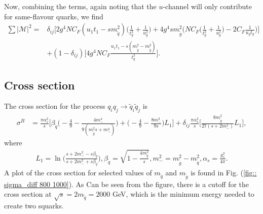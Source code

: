 \documentclass[11pt]{article}
\begin{document}
\begin{flushleft}
Now, combining the terms, again noting that the $u$-channel will only contribute for same-flavour quarks, we find
\begin{align*}
\sum |\mathcal{M}|^2 =& \delta_{ij}  \Bigg[2 g^4NC_F(u_1t_1-sm_{\tilde{q}}^2) \big( \frac{1}{t_g^2} + \frac{1}{u_g^2} \big) + 4 g^4 sm_{\tilde{g}}^2 \Big( NC_F \big(\frac{1}{t_g^2} + \frac{1}{u_g^2}\big) -2C_F\frac{1}{u_gt_g} \Big) \Bigg]\\
&+ (1-\delta_{ij})\Bigg[4g^4NC_F  \frac{u_1t_1-s(m_{\tilde{g}}^2-m_{\tilde{g}}^2)}{t_g^2} \Bigg].
\end{align*}
\end{flushleft}

\subsection*{Cross section}
\begin{flushleft}
The cross section for the process $q_iq_j \rightarrow \tilde{q}_i \tilde{q}_j$ is \cite{beenakker1997squark}
\begin{align*}
\sigma^B &= \frac{\pi \alpha_s^2}{s} \Bigg[\beta_{\tilde{q}} \Big(-\frac{4}{9} - \frac{4m_-^4}{9(m_{\tilde{g}}^2s+m_-^4)} \Big) + \Big(-\frac{4}{9}- \frac{8m_-^2}{9s} \Big) L_1 \Bigg]
+ \delta_{ij} \frac{\pi \alpha_s^2}{s} \Bigg[ \frac{8m_{\tilde{g}}^2}{27(s+2m_-^2)} L_1 \Bigg],
\end{align*}
where
\begin{align*}
L_1 = \ln \Big( \frac{s+2m_-^2-s \beta_{\tilde{q}}}{s+ 2m_-^2+s \beta_{\tilde{q}}} \Big), \beta_{\tilde{q}} = \sqrt{1-\frac{4m_{\tilde{q}}^2}{s}}, m_-^2 = m_{\tilde{g}}^2 - m_{\tilde{q}}^2, \alpha_s = \frac{g_s^2}{4 \pi}.
\end{align*}
A plot of the cross section for selected values of $m_{\tilde{q}}$ and $m_{\tilde{g}}$ is found in Fig. (\ref{fig:: sigma_diff 800 1000}). As Can be seen from the figure, there is a cutoff for the cross section at $\sqrt{s} = 2 m_{\tilde{q}} = 2000$ GeV, which is the minimum energy needed to create two squarks.
\end{flushleft}
\end{document}
